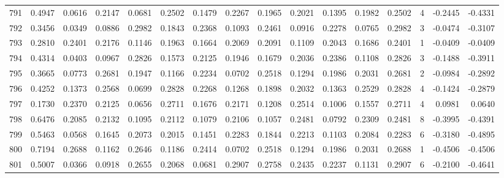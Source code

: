 \begin{tabular}{lrrrrrrrrrrrrrrr}
791 &      0.4947 &  0.0616 &  0.2147 &  0.0681 &  0.2502 &  0.1479 &  0.2267 &  0.1965 &  0.2021 &  0.1395 &   0.1982 &     0.2502 &      4 &                   -0.2445 &                    -0.4331 \\
792 &      0.3456 &  0.0349 &  0.0886 &  0.2982 &  0.1843 &  0.2368 &  0.1093 &  0.2461 &  0.0916 &  0.2278 &   0.0765 &     0.2982 &      3 &                   -0.0474 &                    -0.3107 \\
793 &      0.2810 &  0.2401 &  0.2176 &  0.1146 &  0.1963 &  0.1664 &  0.2069 &  0.2091 &  0.1109 &  0.2043 &   0.1686 &     0.2401 &      1 &                   -0.0409 &                    -0.0409 \\
794 &      0.4314 &  0.0403 &  0.0967 &  0.2826 &  0.1573 &  0.2125 &  0.1946 &  0.1679 &  0.2036 &  0.2386 &   0.1108 &     0.2826 &      3 &                   -0.1488 &                    -0.3911 \\
795 &      0.3665 &  0.0773 &  0.2681 &  0.1947 &  0.1166 &  0.2234 &  0.0702 &  0.2518 &  0.1294 &  0.1986 &   0.2031 &     0.2681 &      2 &                   -0.0984 &                    -0.2892 \\
796 &      0.4252 &  0.1373 &  0.2568 &  0.0699 &  0.2828 &  0.2268 &  0.1268 &  0.1898 &  0.2032 &  0.1363 &   0.2529 &     0.2828 &      4 &                   -0.1424 &                    -0.2879 \\
797 &      0.1730 &  0.2370 &  0.2125 &  0.0656 &  0.2711 &  0.1676 &  0.2171 &  0.1208 &  0.2514 &  0.1006 &   0.1557 &     0.2711 &      4 &                    0.0981 &                     0.0640 \\
798 &      0.6476 &  0.2085 &  0.2132 &  0.1095 &  0.2112 &  0.1079 &  0.2106 &  0.1057 &  0.2481 &  0.0792 &   0.2309 &     0.2481 &      8 &                   -0.3995 &                    -0.4391 \\
799 &      0.5463 &  0.0568 &  0.1645 &  0.2073 &  0.2015 &  0.1451 &  0.2283 &  0.1844 &  0.2213 &  0.1103 &   0.2084 &     0.2283 &      6 &                   -0.3180 &                    -0.4895 \\
800 &      0.7194 &  0.2688 &  0.1162 &  0.2646 &  0.1186 &  0.2414 &  0.0702 &  0.2518 &  0.1294 &  0.1986 &   0.2031 &     0.2688 &      1 &                   -0.4506 &                    -0.4506 \\
801 &      0.5007 &  0.0366 &  0.0918 &  0.2655 &  0.2068 &  0.0681 &  0.2907 &  0.2758 &  0.2435 &  0.2237 &   0.1131 &     0.2907 &      6 &                   -0.2100 &                    -0.4641 \\

\end{tabular}
